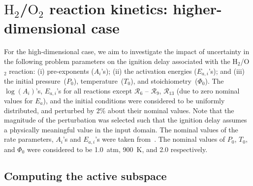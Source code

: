 \section{$\text{H}_2$/$\text{O}_2$ reaction kinetics: higher-dimensional case}
\label{sec:app}

For the high-dimensional case, we aim to investigate the impact of 
uncertainty in the following problem parameters on 
the ignition delay associated with the H$_2$/O$_2$ reaction:
(i) pre-exponents ($A_i$'s); (ii) the activation energies
($E_{a,i}$'s); and (iii) the initial pressure~($P_0$),
temperature~($T_0$), and stoichiometry~($\Phi_0$). 
%
The $\log(A_i)$'s, $E_{a,i}$'s for all reactions except $\mathcal{R}_6$
-- $\mathcal{R}_9$, $\mathcal{R}_{13}$ (due to zero nominal values for $E_a$),
and the initial conditions were considered to be uniformly distributed, and
perturbed by 2$\%$ about their nominal values.
Note that the magnitude of the perturbation was selected such that the
ignition delay assumes a physically meaningful value in the input domain. 
The nominal values of the rate parameters, $A_i$'s and $E_{a,i}$'s 
were taken from~\cite{Yetter:1991}. The nominal values of $P_0$, $T_0$, and
$\Phi_0$ were considered to be 1.0~atm, 900~K, and 2.0 respectively.

\subsection{Computing the active subspace}

